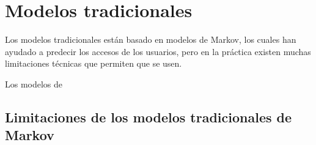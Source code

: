 





\section{Modelos tradicionales}
 
Los modelos tradicionales están basado en modelos de Markov, los cuales han ayudado a predecir los accesos de los usuarios, pero en la práctica existen 
muchas limitaciones técnicas que permiten que se usen. 

Los modelos de  






 
 
 \subsection{Limitaciones de los modelos tradicionales de Markov}
 
